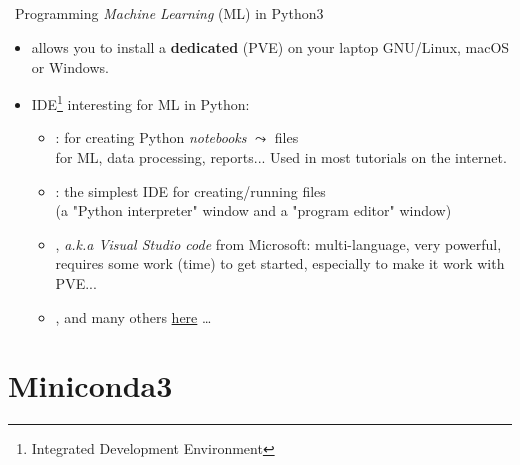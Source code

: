 \documentclass[10pt,serif,mathserif,compress,hyperref={colorlinks}]{beamer}
\title[\hspace*{.75\linewidth}\insertframenumber/\inserttotalframenumber]
      {\fontsize{17}{17}\selectfont{\textbf{Machine learning with Python:\\Create, install \& use a \\Python Virtual Environment (PVE)}}\\[6mm]
      \fontsize{12}{12}\selectfont{\textbf{DuMAS department day -- 2023/09/22}}
}
\subtitle{}
\author[{\tiny{JLC -- Sept23 -- v1.1 }}

\hspace*{.75\linewidth}]
{\fontsize{9}{9}\selectfont{\hspace*{-5mm}Jean-Luc.Charles@mailo.com}}
\institute{}
\date{}
\begin{document}
\frame[plain]{\titlepage}


\begin{frame}
  
  \begin {bclogo}[noborder=true, couleur=gray!50, couleurBarre=Chocolate, logo=\bctrombone, marge=0, margeG=-0.5]
      {\ Programming {\em Machine Learning} (ML) in Python3}
      \medskip
      \begin{itemize}
      \item {} allows you to install a {\bf dedicated}  (PVE) on your laptop
        GNU/Linux, macOS or Windows.\medskip
      \item IDE\footnote{Integrated Development Environment} interesting for ML in Python:
        \begin{itemize}
        \item {}: for creating Python {\em notebooks} $\leadsto$ files \\ for ML, data processing, reports... 
          Used in most tutorials on the internet.\medskip
        \item {}: the simplest IDE for creating/running  files\\
          (a "Python interpreter" window and a "program editor" window)\medskip
        \item {}, {\em a.k.a Visual Studio code} from Microsoft: multi-language, very powerful, requires some work (time) to get started,
          especially to make it work with PVE...\medskip
        \item {},  and many others \href{https://wiki.python.org/moin/IntegratedDevelopmentEnvironments}{here} \ldots
        \end{itemize}
      \end{itemize}
      \medskip
  \end{bclogo}
  
\end{frame}

\section{Miniconda3}
\end{document}
